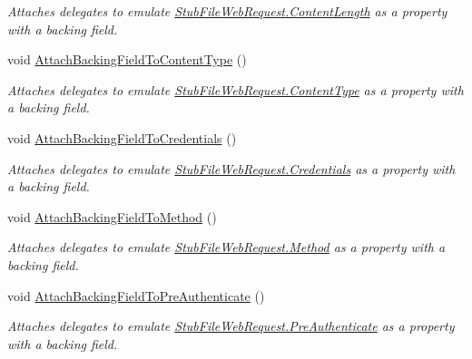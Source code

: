 \begin{DoxyCompactItemize}
\begin{DoxyCompactList}\small\item\em Attaches delegates to emulate \hyperlink{class_system_1_1_net_1_1_fakes_1_1_stub_file_web_request_acf7c0c7744e54ac4d7f076539fca7d68}{Stub\-File\-Web\-Request.\-Content\-Length} as a property with a backing field.\end{DoxyCompactList}\item 
void \hyperlink{class_system_1_1_net_1_1_fakes_1_1_stub_file_web_request_aa2976eb85372f4d45890d25f918a6a79}{Attach\-Backing\-Field\-To\-Content\-Type} ()
\begin{DoxyCompactList}\small\item\em Attaches delegates to emulate \hyperlink{class_system_1_1_net_1_1_fakes_1_1_stub_file_web_request_ae00c2f28434a0eb22d1b8ac38921207f}{Stub\-File\-Web\-Request.\-Content\-Type} as a property with a backing field.\end{DoxyCompactList}\item 
void \hyperlink{class_system_1_1_net_1_1_fakes_1_1_stub_file_web_request_af6e02d4e1aa85820964e39b372ae55e2}{Attach\-Backing\-Field\-To\-Credentials} ()
\begin{DoxyCompactList}\small\item\em Attaches delegates to emulate \hyperlink{class_system_1_1_net_1_1_fakes_1_1_stub_file_web_request_ae664d2650bd467b3d6d48be892d9295c}{Stub\-File\-Web\-Request.\-Credentials} as a property with a backing field.\end{DoxyCompactList}\item 
void \hyperlink{class_system_1_1_net_1_1_fakes_1_1_stub_file_web_request_a760df35ab77e7159b6384ae84af23a41}{Attach\-Backing\-Field\-To\-Method} ()
\begin{DoxyCompactList}\small\item\em Attaches delegates to emulate \hyperlink{class_system_1_1_net_1_1_fakes_1_1_stub_file_web_request_a955364fd0342111c27ee135baba3773c}{Stub\-File\-Web\-Request.\-Method} as a property with a backing field.\end{DoxyCompactList}\item 
void \hyperlink{class_system_1_1_net_1_1_fakes_1_1_stub_file_web_request_ac9667f768f3e9688eca073ac259467a4}{Attach\-Backing\-Field\-To\-Pre\-Authenticate} ()
\begin{DoxyCompactList}\small\item\em Attaches delegates to emulate \hyperlink{class_system_1_1_net_1_1_fakes_1_1_stub_file_web_request_ae3397bf1478ee278d848a7bd88c8c11a}{Stub\-File\-Web\-Request.\-Pre\-Authenticate} as a property with a backing field.\end{DoxyCompactList}\item 

\end{DoxyCompactItemize}
